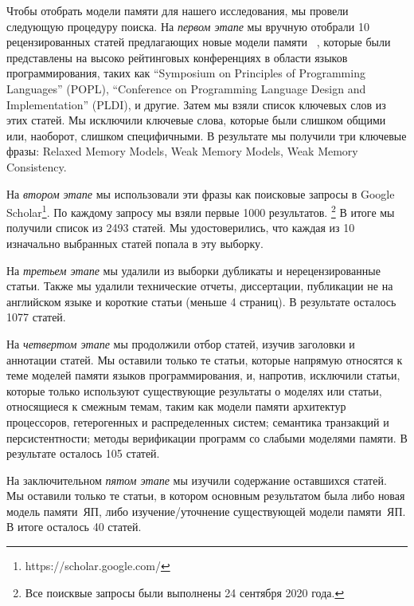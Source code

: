 Чтобы отобрать модели памяти для нашего исследования, 
мы провели следующую процедуру поиска. 
На \emph{первом этапе} мы вручную отобрали 10 рецензированных статей 
предлагающих новые модели памяти~%
\cite{
Manson-al:POPL05,
Batty-al:POPL11,
Lahav-al:PLDI17,
Dolan-al:PLDI18,
Watt-al:PLDI2020,
Jeffrey-Riely:LICS16,
PichonPharabod-Sewell:POPL16,
Kang-al:POPL17,
Chakraborty-Vafeiadis:POPL19,
Paviotti-al:ESOP20
},
которые были представлены на высоко рейтинговых конференциях
в области языков программирования, таких как
``Symposium on Principles of Programming Languages'' (POPL),
``Conference on Programming Language Design and Implementation'' (PLDI), 
и другие. Затем мы взяли список ключевых слов из этих статей. 
Мы исключили ключевые слова, которые были слишком общими
или, наоборот, слишком специфичными. 
В результате мы получили три ключевые фразы: Relaxed Memory Models, Weak Memory Models, Weak Memory Consistency.

На \emph{втором этапе} мы использовали эти фразы как 
поисковые запросы в Google Scholar\footnote{https://scholar.google.com/}.
По каждому запросу мы взяли первые 1000 результатов.%
\footnote{Все поисквые запросы были выполнены 24 сентября 2020 года.}
В итоге мы получили список из 2493 статей. 
Мы удостоверились, что каждая из 10 изначально выбранных статей 
попала в эту выборку. 

На \emph{третьем этапе} мы удалили из выборки дубликаты и нерецензированные статьи. 
Также мы удалили технические отчеты, диссертации, 
публикации не на английском языке и короткие статьи (меньше 4 страниц). 
В результате осталось 1077 статей. 

На \emph{четвертом этапе} мы продолжили отбор статей, изучив 
заголовки и аннотации статей. 
Мы оставили только те статьи, которые напрямую относятся 
к теме моделей памяти языков программирования, 
и, напротив, исключили статьи, которые только используют 
существующие результаты о моделях или статьи, относящиеся 
к смежным темам, таким как
 модели памяти архитектур процессоров, гетерогенных и распределенных систем; семантика транзакций и персистентности; методы верификации программ со слабыми моделями памяти.
В результате осталось 105 статей.

На заключительном \emph{пятом этапе} мы изучили содержание оставшихся статей. 
Мы оставили только те статьи, в котором основным результатом была либо новая модель памяти~ЯП, либо изучение/уточнение существующей модели памяти~ЯП.
В итоге осталось 40 статей.

